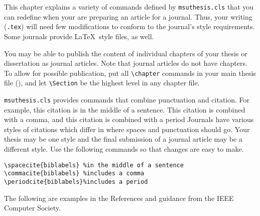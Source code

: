 %
This chapter explains a variety of commands defined by {\tt msuthesis.cls}
that you can redefine when your are preparing an article for
a journal.  
Thus, your writing ({\tt *.tex}) will need few modifications
to conform to the journal's style requirements.
Some journals provide \LaTeX\ style files, as well.

%
%
{\sloppy
You may be able to publish the content of individual chapters
of your thesis or dissertation
as journal articles.  
Note that journal articles do not have chapters.
To allow for possible publication,
put all \verb+\chapter+ commands in your main thesis file
(),
and let \verb+\Section+ be the highest level in any chapter file.

} %

%
%
{\tt msuthesis.cls} provides commands 
that combine punctuation and citation.
For example, this citation%
 is in the middle of a sentence.
This citation%
 is combined with a comma,
and this citation is combined with a period%
Journals have various styles of citations which differ in 
where spaces and punctuation should go.
Your thesis may be one style and the final submission
of a journal article
may be a different style.
Use the following commands 
so that changes are easy to make.

\newspacing{\singlespacing}\begin{verbatim}
\spacecite{biblabels} %in the middle of a sentence
\commacite{biblabels} %includes a comma
\periodcite{biblabels}%includes a period
\end{verbatim}

%
%
\nocite{*}%
The following are examples in the References and guidance 
from the IEEE Computer Society.


